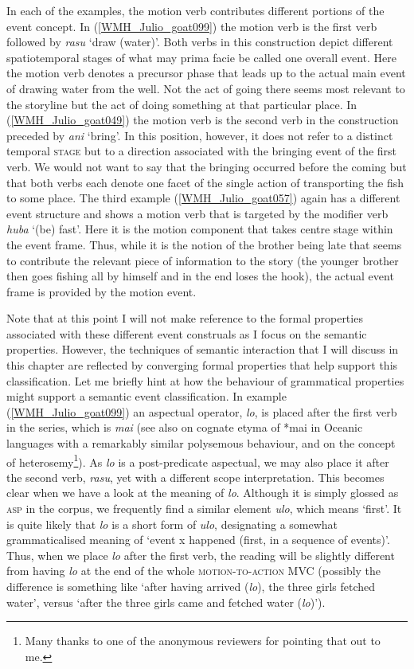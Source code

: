 In each of the examples, the motion verb contributes different portions of the event concept. In (\ref{WMH_Julio_goat099}) the motion verb is the first verb followed by \textit{rasu} `draw (water)'. Both verbs in this construction depict different spatiotemporal stages of what may prima facie be called one overall event. Here the motion verb denotes a precursor phase that leads up to the actual main event of drawing water from the well. Not the act of going there seems most relevant to the storyline but the act of doing something at that particular place. In (\ref{WMH_Julio_goat049}) the motion verb is the second verb in the construction preceded by \textit{ani} `bring'. In this position, however, it does not refer to a distinct temporal \textsc{stage} but to a direction associated with the bringing event of the first verb. We would not want to say that the bringing occurred before the coming but that both verbs each denote one facet of the single action of transporting the fish to some place. The third example (\ref{WMH_Julio_goat057}) again has a different event structure and shows a motion verb that is targeted by the modifier verb \textit{huba} `(be) fast'. Here it is the motion component that takes centre stage within the event frame. Thus, while it is the notion of the brother being late that seems to contribute the relevant piece of information to the story (the younger brother then goes fishing all by himself and in the end loses the hook), the actual event frame is provided by the motion event.

Note that at this point I will not make reference to the formal properties associated with these different event construals as I focus on the semantic properties. However, the techniques of semantic interaction that I will discuss in this chapter are reflected by converging formal properties that help support this classification. Let me briefly hint at how the behaviour of grammatical properties might support a semantic event classification. In example (\ref{WMH_Julio_goat099}) an aspectual operator, \textit{lo}, is placed after the first verb in the series, which is \textit{mai} (see also \citealt{lichtenberk1991semantic} on cognate etyma of *mai in Oceanic languages with a remarkably similar polysemous behaviour, and on the concept of heterosemy\footnote{Many thanks to one of the anonymous reviewers for pointing that out to me.}). As \textit{lo} is a post-predicate aspectual, we may also place it after the second verb, \textit{rasu}, yet with a different scope interpretation. This becomes clear when we have a look at the meaning of \textit{lo}. Although it is simply glossed as \textsc{asp} in the  corpus, we frequently find a similar element \textit{ulo}, which means `first'. It is quite likely that \textit{lo} is a short form of \textit{ulo}, designating a somewhat grammaticalised meaning of `event x happened (first, in a sequence of events)'. Thus, when we place \textit{lo} after the first verb, the reading will be slightly different from having \textit{lo} at the end of the whole \textsc{motion-to-action} MVC (possibly the difference is something like `after having arrived (\textit{lo}), the three girls fetched water', versus `after the three girls came and fetched water (\textit{lo})').

